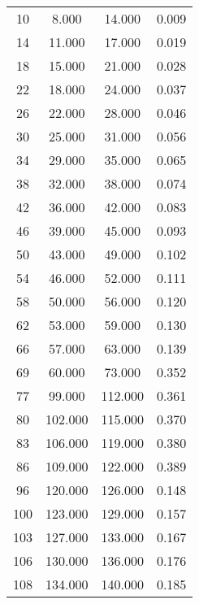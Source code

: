 % 
\begin{tabular}{cccc}
  \hline
  \hline
10 & 8.000 & 14.000 & 0.009 \\ 
  14 & 11.000 & 17.000 & 0.019 \\ 
  18 & 15.000 & 21.000 & 0.028 \\ 
  22 & 18.000 & 24.000 & 0.037 \\ 
  26 & 22.000 & 28.000 & 0.046 \\ 
  30 & 25.000 & 31.000 & 0.056 \\ 
  34 & 29.000 & 35.000 & 0.065 \\ 
  38 & 32.000 & 38.000 & 0.074 \\ 
  42 & 36.000 & 42.000 & 0.083 \\ 
  46 & 39.000 & 45.000 & 0.093 \\ 
  50 & 43.000 & 49.000 & 0.102 \\ 
  54 & 46.000 & 52.000 & 0.111 \\ 
  58 & 50.000 & 56.000 & 0.120 \\ 
  62 & 53.000 & 59.000 & 0.130 \\ 
  66 & 57.000 & 63.000 & 0.139 \\ 
  69 & 60.000 & 73.000 & 0.352 \\ 
  77 & 99.000 & 112.000 & 0.361 \\ 
  80 & 102.000 & 115.000 & 0.370 \\ 
  83 & 106.000 & 119.000 & 0.380 \\ 
  86 & 109.000 & 122.000 & 0.389 \\ 
  96 & 120.000 & 126.000 & 0.148 \\ 
  100 & 123.000 & 129.000 & 0.157 \\ 
  103 & 127.000 & 133.000 & 0.167 \\ 
  106 & 130.000 & 136.000 & 0.176 \\ 
  108 & 134.000 & 140.000 & 0.185 \\ 
   \hline
\end{tabular}
